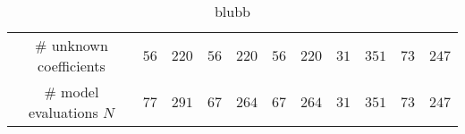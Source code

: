 \begin{table}[!ht]
\begin{tabularx}{\textwidth}{XXXXXXXXXXXX}
    \multicolumn{2}{c}{\# unknown coefficients} &
    \multicolumn{1}{c}{$56$} &
    \multicolumn{1}{c}{$220$} &
    \multicolumn{1}{c}{$56$} &
    \multicolumn{1}{c}{$220$} &
    \multicolumn{1}{c}{$56$} &
    \multicolumn{1}{c}{$220$} &
    \multicolumn{1}{c}{$31$} &
    \multicolumn{1}{c}{$351$} &
    \multicolumn{1}{c}{$73$} &
    \multicolumn{1}{c}{$247$} \\
    \multicolumn{2}{c}{\# model evaluations $N$} &
    \multicolumn{1}{c}{$77$} &
    \multicolumn{1}{c}{$291$} &
    \multicolumn{1}{c}{$67$} &
    \multicolumn{1}{c}{$264$} &
    \multicolumn{1}{c}{$67$} &
    \multicolumn{1}{c}{$264$} &
    \multicolumn{1}{c}{$31$} &
    \multicolumn{1}{c}{$351$} &
    \multicolumn{1}{c}{$73$} &
    \multicolumn{1}{c}{$247$} \\
    \bottomrule
  \end{tabularx}
  \caption{blubb}
  \label{tab::ishigami-anova}
\end{table}

